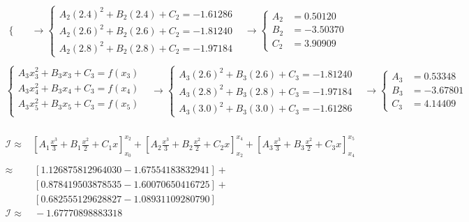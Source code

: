 \documentclass[11pt]{homework}
\begin{document}
\begin{alphaparts}
\begin{align*}
\begin{cases}
            \end{cases}
            & \to 
            \begin{cases}
            A_2  (2.4)^2 + B_2  (2.4) + C_2   = -1.61286 \\
            A_2  (2.6)^2 + B_2  (2.6) + C_2   = -1.81240 \\
            A_2  (2.8)^2 + B_2  (2.8) + C_2   = -1.97184
            \end{cases}
            & \to 
            \begin{cases}
            A_2   &= 0.50120\\
            B_2   &= -3.50370\\
            C_2   &= 3.90909
            \end{cases}\\
        \end{align*}
        \begin{align*}
            \begin{cases}
            A_3  x_3^2 + B_3  x_3 + C_3   = f(x_3) \\
            A_3  x_4^2 + B_3  x_4 + C_3   = f(x_4) \\
            A_3  x_5^2 + B_3  x_5 + C_3   = f(x_5) \\
            \end{cases}
            & \to 
            \begin{cases}
            A_3  (2.6)^2 + B_3  (2.6) + C_3   = -1.81240 \\
            A_3  (2.8)^2 + B_3  (2.8) + C_3   = -1.97184 \\
            A_3  (3.0)^2 + B_3  (3.0) + C_3   = -1.61286
            \end{cases}
            & \to 
            \begin{cases}
            A_3   &= 0.53348\\
            B_3   &= -3.67801\\
            C_3   &= 4.14409
            \end{cases}\\
        \end{align*}
        
        \begin{align*}
            \pmb{\mathcal{I}} \approx &
            \left[A_1  \frac{x^3}{3} + B_1  \frac{x^2}{2} + C_1  x \right]_{x_0}^{x_2} + 
            \left[A_2  \frac{x^3}{3} + B_2  \frac{x^2}{2} + C_2  x \right]_{x_2}^{x_4} + 
            \left[A_3  \frac{x^3}{3} + B_3  \frac{x^2}{2} + C_3  x \right]_{x_4}^{x_5} \\
            \\
            \approx & \ 
                [ 1.126875812964030 - 1.67554183832941 ] +\\
            & \ [ 0.878419503878535 - 1.60070650416725 ] + \\
            & \ [ 0.682555129628827 - 1.08931109280790 ]
            \\
            \pmb{\mathcal{I}} \approx & \ -1.67770898883318
        \end{align*}

    \end{alphaparts}
    
\end{document}
